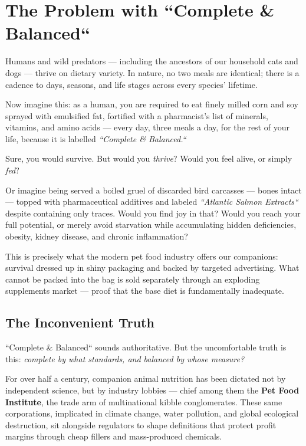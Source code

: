 
\section{The Problem with ``Complete \& Balanced``}

Humans and wild predators --- including the ancestors of our household cats and dogs --- thrive on dietary variety. In nature, no two meals are identical; there is a cadence to days, seasons, and life stages across every species' lifetime.

Now imagine this: as a human, you are required to eat finely milled corn and soy sprayed with emulsified fat, fortified with a pharmacist's list of minerals, vitamins, and amino acids --- every day, three meals a day, for the rest of your life, because it is labelled \textit{``Complete \& Balanced.``}

Sure, you would survive. But would you \textit{thrive}? Would you feel alive, or simply \textit{fed}?

Or imagine being served a boiled gruel of discarded bird carcasses --- bones intact --- topped with pharmaceutical additives and labeled \textit{``Atlantic Salmon Extracts``} despite containing only traces. Would you find joy in that? Would you reach your full potential, or merely avoid starvation while accumulating hidden deficiencies, obesity, kidney disease, and chronic inflammation?

This is precisely what the modern pet food industry offers our companions: survival dressed up in shiny packaging and backed by targeted advertising. What cannot be packed into the bag is sold separately through an exploding supplements market --- proof that the base diet is fundamentally inadequate.

\subsection*{The Inconvenient Truth}

``Complete \& Balanced`` sounds authoritative. But the uncomfortable truth is this: \textit{complete by what standards, and balanced by whose measure?\cite{ref64}}

For over half a century, companion animal nutrition has been dictated not by independent science, but by industry lobbies --- chief among them the \textbf{Pet Food Institute}\cite{ref71}, the trade arm of multinational kibble conglomerates. These same corporations, implicated in climate change, water pollution, and global ecological destruction, sit alongside regulators to shape definitions that protect profit margins through cheap fillers and mass-produced chemicals.

